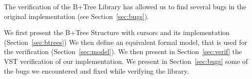   The verification of the B+Tree Library has allowed us to find several bugs in the original implementation (see Section~\ref{sec:bugs}).

  We first present the B+Tree Structure with cursors and its implementation (Section~\ref{sec:btrees})
  We then define an equivalent formal model, that is used for the verification (Section~\ref{sec:model}).
  We then present in Section~\ref{sec:verif} the VST verification of our implementation.
  We present in Section~\ref{sec:bugs} some of the bugs we encountered and fixed while verifying the library.
